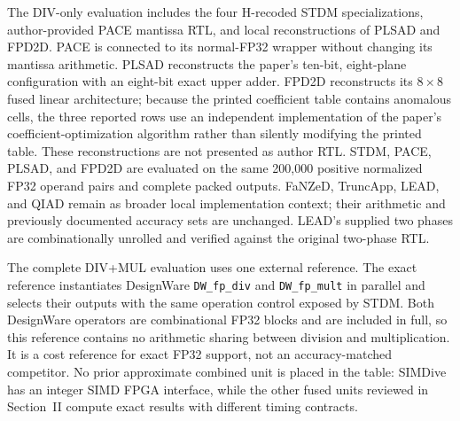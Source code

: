 \documentclass[conference]{IEEEtran}
\begin{document}
The DIV-only evaluation includes the four H-recoded STDM specializations,
author-provided PACE mantissa RTL, and local reconstructions of PLSAD and FPD2D.
PACE is connected to its normal-FP32 wrapper without changing its mantissa
arithmetic. PLSAD reconstructs the paper's ten-bit, eight-plane configuration
with an eight-bit exact upper adder. FPD2D reconstructs its $8\times8$ fused
linear architecture; because the printed coefficient table contains anomalous
cells, the three reported rows use an independent implementation of the
paper's coefficient-optimization algorithm rather than silently modifying the
printed table. These reconstructions are not presented as author RTL. STDM,
PACE, PLSAD, and FPD2D are evaluated on the same 200,000 positive normalized
FP32 operand pairs and complete packed outputs. FaNZeD, TruncApp, LEAD, and
QIAD remain as broader local implementation context; their arithmetic and
previously documented accuracy sets are unchanged. LEAD's supplied two phases
are combinationally unrolled and verified against the original two-phase RTL.

The complete DIV+MUL evaluation uses one external reference. The exact reference
instantiates DesignWare \texttt{DW\_fp\_div} and \texttt{DW\_fp\_mult} in
parallel and selects their outputs with the same operation control exposed by
STDM. Both DesignWare operators are combinational FP32 blocks and are included
in full, so this reference contains no arithmetic sharing between division and
multiplication. It is a cost reference for exact FP32 support, not an
accuracy-matched competitor. No prior approximate combined unit is placed in
the table: SIMDive has an integer SIMD FPGA interface, while the other fused
units reviewed in Section~II compute exact results with different timing
contracts.
\end{document}
